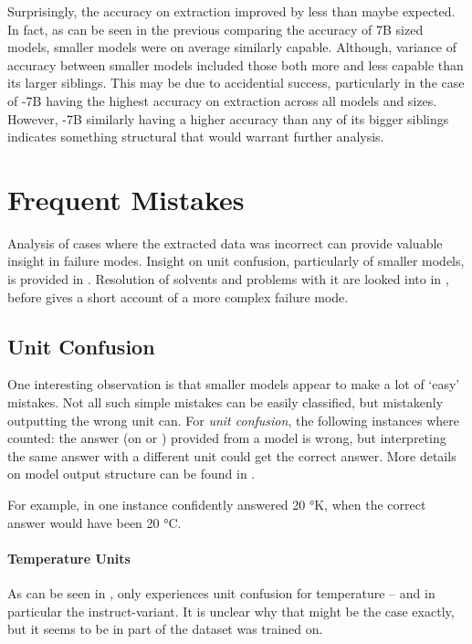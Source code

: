 Surprisingly, the accuracy on \tsolv extraction improved by less than maybe expected.
In fact, as can be seen in the previous  comparing the accuracy of 7B sized models, smaller models were on average similarly capable.
Although, variance of accuracy between smaller models included those both more and less capable than its larger siblings.
This may be due to accidential success, particularly in the case of -7B having the highest accuracy on \tsolv extraction across all models and sizes.
However, -7B similarly having a higher accuracy than any of its bigger siblings indicates something structural that would warrant further analysis.




\section{Frequent Mistakes}\label{sec:mistakes}
Analysis of cases where the extracted data was incorrect can provide valuable insight in failure modes.
Insight on unit confusion, particularly of smaller models, is provided in .
Resolution of solvents and problems with it are looked into in , before  gives a short account of a more complex failure mode.





\subsection{Unit Confusion}\label{sub:unitconfusion}
One interesting observation is that smaller models appear to make a lot of `easy' mistakes.
Not all such simple mistakes can be easily classified, but mistakenly outputting the wrong unit can.
For \textit{unit confusion}, the following instances where counted: the answer (on \ttemp or \ttime) provided from a model is wrong, but interpreting the same answer with a different unit could get the correct answer.
More details on model output structure can be found in .

For example, in one instance  confidently answered 20 °K, when the correct answer would have been 20 °C.

\paragraph{Temperature Units}
As can be seen in , only  experiences unit confusion for temperature -- and in particular the instruct-variant.
It is unclear why that might be the case exactly, but it seems to be in part of the dataset  was trained on.

